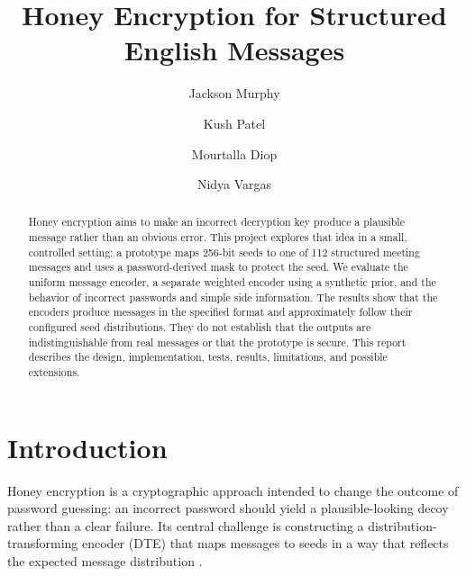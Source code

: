 \documentclass[sigconf,nonacm]{acmart}
\begin{document}
\title{Honey Encryption for Structured English Messages}

\author{Jackson Murphy}

\author{Kush Patel}

\author{Mourtalla Diop}

\author{Nidya Vargas}

\begin{abstract}
Honey encryption aims to make an incorrect decryption key produce a plausible
message rather than an obvious error. This project explores that idea in a
small, controlled setting: a prototype maps 256-bit seeds to one of 112
structured meeting messages and uses a password-derived mask to protect the
seed. We evaluate the uniform message encoder, a separate weighted encoder
using a synthetic prior, and the behavior of incorrect passwords and simple
side information. The results show that the encoders produce messages in the
specified format and approximately follow their configured seed
distributions. They do not establish that the outputs are indistinguishable
from real messages or that the prototype is secure. This report describes the
design, implementation, tests, results, limitations, and possible extensions.
\end{abstract}


\maketitle

\section{Introduction}
\label{sec:introduction}

Honey encryption is a cryptographic approach intended to change the outcome
of password guessing: an incorrect password should yield a plausible-looking
decoy rather than a clear failure. Its central challenge is constructing a
distribution-transforming encoder (DTE) that maps messages to seeds in a way
that reflects the expected message distribution
\cite{juels2014honey}.
\end{document}
